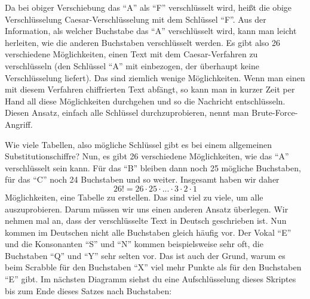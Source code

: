 \documentclass[a4paper,ngerman,12pt]{scrartcl}
\theoremstyle{definition}
\begin{document}
Da bei obiger Verschiebung das "`A"' als "`F"' verschlüsselt wird, heißt die obige Verschlüsselung Caesar-Verschlüsselung mit dem Schlüssel "`F"'. Aus der Information, als welcher Buchstabe das "`A"' verschlüsselt wird, kann man leicht herleiten, wie die anderen Buchstaben verschlüsselt werden. Es gibt also 26 verschiedene Möglichkeiten, einen Text mit dem Caesar-Verfahren zu verschlüsseln (den Schlüssel "`A"' mit einbezogen, der überhaupt keine Verschlüsselung liefert). Das sind ziemlich wenige Möglichkeiten. Wenn man einen mit diesem Verfahren chiffrierten Text abfängt, so kann man in kurzer Zeit per Hand all diese Möglichkeiten durchgehen und so die Nachricht entschlüsseln. Diesen Ansatz, einfach alle Schlüssel durchzuprobieren, nennt man Brute-Force-Angriff.

Wie viele Tabellen, also mögliche Schlüssel gibt es bei einem allgemeinen Substitutionschiffre? Nun, es gibt 26 verschiedene Möglichkeiten, wie das "`A"' verschlüsselt sein kann. Für das "`B"' bleiben dann noch 25 mögliche Buchstaben, für das "`C"' noch 24 Buchstaben und so weiter. Insgesamt haben wir daher
\[ 26! = 26 \cdot 25 \cdot ... \cdot 3 \cdot 2 \cdot 1 \]
Möglichkeiten, eine Tabelle zu erstellen. Das sind viel zu viele, um alle auszuprobieren. Darum müssen wir uns einen anderen Ansatz überlegen. Wir nehmen mal an, dass der verschlüsselte Text in Deutsch geschrieben ist. Nun kommen im Deutschen nicht alle Buchstaben gleich häufig vor. Der Vokal "`E"' und die Konsonanten "`S"' und "`N"' kommen beispielsweise sehr oft, die Buchstaben "`Q"' und "`Y"' sehr selten vor. Das ist auch der Grund, warum es beim Scrabble für den Buchstaben "`X"' viel mehr Punkte als für den Buchstaben "`E"' gibt. Im nächsten Diagramm siehst du eine Aufschlüsselung dieses Skriptes bis zum Ende dieses Satzes nach Buchstaben:


\begin{center}
\end{center}
\end{document}
